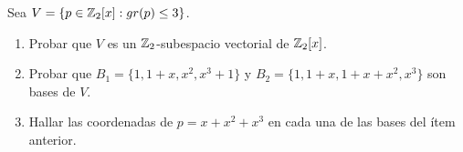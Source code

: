 \item Sea $V=\{p\in\mathbb{Z}_2[x]:gr(p)\leq3\}$.
    \begin{enumerate}
        \item Probar que $V$ es un $\mathbb{Z}_2$-subespacio vectorial de $\mathbb{Z}_2[x]$.
            \begin{mdframed}[style=s]
                
            \end{mdframed}
        \item Probar que $B_1=\{1,1+x,x^2,x^3+1\}$ y $B_2=\{1,1+x,1+x+x^2,x^3\}$ son bases de $V$.
            \begin{mdframed}[style=s]
                
            \end{mdframed}
        \item Hallar las coordenadas de $p=x+x^2+x^3$ en cada una de las bases del ítem anterior.
            \begin{mdframed}[style=s]
                
            \end{mdframed}
    \end{enumerate}